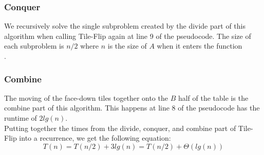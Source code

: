 \documentclass[12pt]{article}
\begin{document}
\subsubsection*{Conquer}
We recursively solve the single subproblem created by the divide part of this algorithm when calling Tile-Flip again at line 9 of the pseudocode.  The size of each subproblem is $n/2$ where $n$ is the size of $A$ when it enters the function\\.   
\subsubsection*{Combine}
The moving of the face-down tiles together onto the $B$ half of the table is the combine part of this algorithm.  This happens at line 8 of the pseudocode has the runtime of $2lg(n)$.\\

Putting together the times from the divide, conquer, and combine part of Tile-Flip into a recurrence, we get the following equation:
$$
T(n) = T(n/2) + 3lg(n) = T(n/2) + \Theta{(lg(n))}
$$
\end{document}
